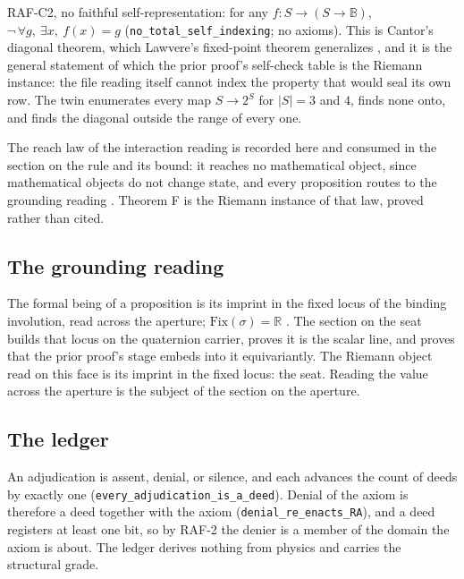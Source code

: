 \documentclass[10pt]{article}
\begin{document}
RAF-C2, no faithful self-representation: for any
\(f : S \to (S \to \mathbb{B})\),
\(\neg\,\forall g,\ \exists x,\ f(x) = g\)
(\texttt{no\_\allowbreak total\_\allowbreak self\_\allowbreak indexing};
no axioms). This is Cantor's diagonal theorem, which Lawvere's
fixed-point theorem generalizes \cite{lawvere1969}, and it is the
general statement of which the prior proof's self-check table is the
Riemann instance: the file reading itself cannot index the property that
would seal its own row. The twin enumerates every map \(S \to 2^S\) for
\(|S| = 3\) and \(4\), finds none onto, and finds the diagonal outside
the range of every one.

The reach law of the interaction reading is recorded here and consumed
in the section on the rule and its bound: it reaches no mathematical
object, since mathematical objects do not change state, and every
proposition routes to the grounding reading \cite{islamraf, islamfae}.
Theorem F is the Riemann instance of that law, proved rather than cited.

\hypertarget{the-grounding-reading}{%
\subsection{The grounding reading}\label{the-grounding-reading}}

The formal being of a proposition is its imprint in the fixed locus of
the binding involution, read across the aperture;
\(\mathrm{Fix}(\sigma) = \mathbb{R}\) \cite{islamraf}. The section on
the seat builds that locus on the quaternion carrier, proves it is the
scalar line, and proves that the prior proof's stage embeds into it
equivariantly. The Riemann object read on this face is its imprint in
the fixed locus: the seat. Reading the value across the aperture is the
subject of the section on the aperture.

\hypertarget{the-ledger}{%
\subsection{The ledger}\label{the-ledger}}

An adjudication is assent, denial, or silence, and each advances the
count of deeds by exactly one
(\texttt{every\_\allowbreak adjudication\_\allowbreak is\_\allowbreak a\_\allowbreak deed}).
Denial of the axiom is therefore a deed together with the axiom
(\texttt{denial\_\allowbreak re\_\allowbreak enacts\_\allowbreak RA}),
and a deed registers at least one bit, so by RAF-2 the denier is a
member of the domain the axiom is about. The ledger derives nothing from
physics and carries the structural grade.
\end{document}
